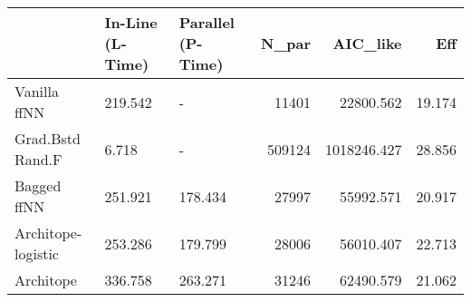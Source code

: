 \begin{tabular}{lllrrr}
\toprule
{} & In-Line (L-Time) & Parallel (P-Time) &   N\_par &     AIC\_like &     Eff \\
\midrule
Vanilla ffNN       &          219.542 &                 - &   11401 &    22800.562 &  19.174 \\
Grad.Bstd Rand.F   &            6.718 &                 - &  509124 &  1018246.427 &  28.856 \\
Bagged ffNN        &          251.921 &           178.434 &   27997 &    55992.571 &  20.917 \\
Architope-logistic &          253.286 &           179.799 &   28006 &    56010.407 &  22.713 \\
Architope          &          336.758 &           263.271 &   31246 &    62490.579 &  21.062 \\
\bottomrule
\end{tabular}
